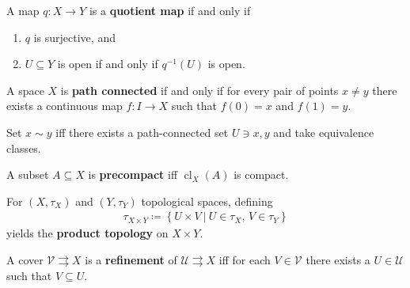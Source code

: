 \begin{definition}

A map \(q:X\to Y\) is a \textbf{quotient map} if and only if

\begin{enumerate}
\def\labelenumi{\arabic{enumi}.}
\tightlist
\item
  \(q\) is surjective, and
\item
  \(U \subseteq Y\) is open if and only if \(q ^{-1} (U)\) is open.
\end{enumerate}

\end{definition}

\begin{definition}

A space \(X\) is \textbf{path connected} if and only if for every pair
of points \(x\neq y\) there exists a continuous map \(f:I \to X\) such
that \(f(0) = x\) and \(f(1) = y\).

\end{definition}

\begin{definition}

Set \(x\sim y\) iff there exists a path-connected set \(U\ni x, y\) and
take equivalence classes.

\end{definition}

\begin{definition}[Precompact]

A subset \(A\subseteq X\) is \textbf{precompact} iff
\(\operatorname{cl}_{X}(A)\) is compact.

\end{definition}

\begin{definition}

For \((X, \tau_X)\) and \((Y, \tau_Y)\) topological spaces, defining
\begin{align*}
\tau_{X \times Y} \coloneqq\left\{{U \times V {~\mathrel{\Big|}~}U\in \tau_X,\, V\in \tau_Y}\right\}
\end{align*}
yields the \textbf{product topology} on \(X \times Y\).

\end{definition}

\begin{definition}[Refinement]

A cover \({\mathcal{V}}\rightrightarrows X\) is a \textbf{refinement} of
\({\mathcal{U}}\rightrightarrows X\) iff for each \(V\in {\mathcal{V}}\)
there exists a \(U\in{\mathcal{U}}\) such that \(V\subseteq U\).

\end{definition}

